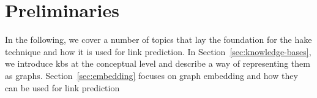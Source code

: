 \section{Preliminaries}\label{sec:preliminaries}

In the following, we cover a number of topics that lay the foundation for the \ac{hake} technique and how it is used for link prediction.
In Section~\ref{sec:knowledge-bases}, we introduce \acp{kb} at the conceptual level and describe a way of representing them as graphs.
Section~\ref{sec:embedding} focuses on graph embedding and how they can be used for link prediction




